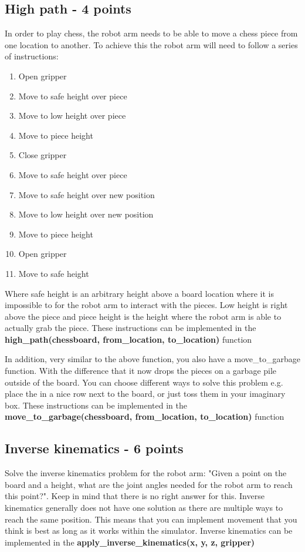 \documentclass{article}
\begin{document}
\subsection*{High path - 4 points}
In order to play chess, the robot arm needs to be able to move a chess piece from one location to another. To achieve this the robot arm will need to follow a series of instructions:
\begin{enumerate}
\item Open gripper
\item Move to safe height over piece
\item Move to low height over piece
\item Move to piece height
\item Close gripper
\item Move to safe height over piece
\item Move to safe height over new position
\item Move to low height over new position
\item Move to piece height
\item Open gripper
\item Move to safe height
\end{enumerate}
Where safe height is an arbitrary height above a board location where it is impossible to for the robot arm to interact with the pieces. Low height is right above the piece and piece height is the height where the robot arm is able to actually grab the piece. These instructions can be implemented in the \textbf{high\_path(chessboard, from\_location, to\_location)} function

In addition, very similar to the above function, you also have a move\_to\_garbage function. With the difference that it now drops the pieces on a garbage pile outside of the board. You can choose different ways to solve this problem e.g. place the in a nice row next to the board, or just toss them in your imaginary box. These instructions can be implemented in the \textbf{move\_to\_garbage(chessboard, from\_location, to\_location)} function

\subsection*{Inverse kinematics - 6 points}
Solve the inverse kinematics problem for the robot arm: "Given a point on the board and a height, what are the joint angles needed for the robot arm to reach this point?". Keep in mind that there is no right answer for this. Inverse kinematics generally does not have one solution as there are multiple ways to reach the same position. This means that you can implement movement that you think is best as long as it works within the simulator. Inverse kinematics can be implemented in the \textbf{apply\_inverse\_kinematics(x, y, z, gripper)}
\end{document}
